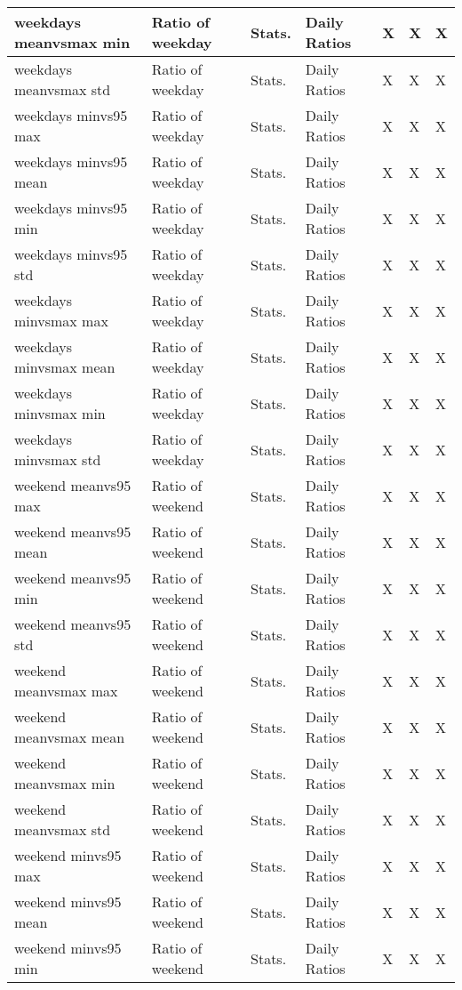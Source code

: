 {{\begin{longtable}[l]{ | p{4cm} | p{4cm} | p{1cm} | p{2cm} | p{0.3cm} | p{0.3cm} | p{0.3cm} |}
	 weekdays meanvsmax min & Ratio of weekday  & Stats. & Daily Ratios & X & X & X \\ \hline
	 weekdays meanvsmax std & Ratio of weekday  & Stats. & Daily Ratios & X & X & X \\ \hline
	 weekdays minvs95 max & Ratio of weekday  & Stats. & Daily Ratios & X & X & X \\ \hline
	 weekdays minvs95 mean & Ratio of weekday  & Stats. & Daily Ratios & X & X & X \\ \hline
	 weekdays minvs95 min & Ratio of weekday  & Stats. & Daily Ratios & X & X & X \\ \hline
	 weekdays minvs95 std & Ratio of weekday  & Stats. & Daily Ratios & X & X & X \\ \hline
	 weekdays minvsmax max & Ratio of weekday  & Stats. & Daily Ratios & X & X & X \\ \hline
	 weekdays minvsmax mean & Ratio of weekday  & Stats. & Daily Ratios & X & X & X \\ \hline
	 weekdays minvsmax min & Ratio of weekday  & Stats. & Daily Ratios & X & X & X \\ \hline
	 weekdays minvsmax std & Ratio of weekday  & Stats. & Daily Ratios & X & X & X \\ \hline
	 weekend meanvs95 max & Ratio of weekend  & Stats. & Daily Ratios & X & X & X \\ \hline
	 weekend meanvs95 mean & Ratio of weekend  & Stats. & Daily Ratios & X & X & X \\ \hline
	 weekend meanvs95 min & Ratio of weekend  & Stats. & Daily Ratios & X & X & X \\ \hline
	 weekend meanvs95 std & Ratio of weekend  & Stats. & Daily Ratios & X & X & X \\ \hline
	 weekend meanvsmax max & Ratio of weekend  & Stats. & Daily Ratios & X & X & X \\ \hline
	 weekend meanvsmax mean & Ratio of weekend  & Stats. & Daily Ratios & X & X & X \\ \hline
	 weekend meanvsmax min & Ratio of weekend  & Stats. & Daily Ratios & X & X & X \\ \hline
	 weekend meanvsmax std & Ratio of weekend  & Stats. & Daily Ratios & X & X & X \\ \hline
	 weekend minvs95 max & Ratio of weekend  & Stats. & Daily Ratios & X & X & X \\ \hline
	 weekend minvs95 mean & Ratio of weekend  & Stats. & Daily Ratios & X & X & X \\ \hline
	 weekend minvs95 min & Ratio of weekend  & Stats. & Daily Ratios & X & X & X \\ \hline

\end{longtable}}}
